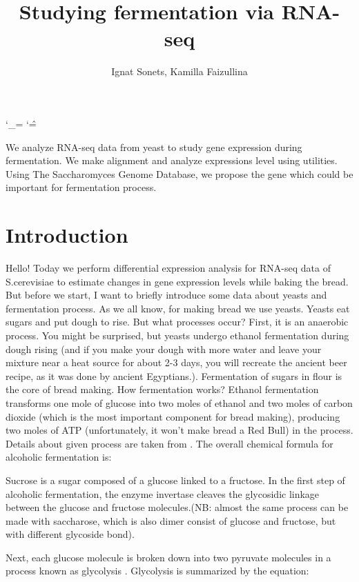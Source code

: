 \documentclass{article}
\title{Studying  fermentation via RNA-seq  }
\author{ Ignat Sonets, Kamilla Faizullina}
\date{\empty}
\begin{document}
	
		\catcode`\_=\active
	\catcode`\^=\active
	
\maketitle
 We analyze RNA-seq data from yeast  to study gene expression   during fermentation. We make alignment and analyze expressions level using utilities. Using The Saccharomyces Genome Database, we propose the gene which could be important for fermentation process. 
 
\section{Introduction}
 
 Hello! Today we perform differential expression analysis for RNA-seq data of S.cerevisiae to estimate changes in gene expression levels while baking the bread. But before we start, I want to briefly introduce some data about yeasts and fermentation process.
 As we all  know, for making bread we use yeasts. Yeasts eat sugars and put dough to rise. But what processes occur? First, it is an anaerobic process. You might be surprised, but yeasts undergo ethanol fermentation during dough rising (and if you make your dough with more water and leave your mixture near a heat source for about 2-3 days, you will recreate the ancient beer recipe, as it was done by ancient Egyptians.). Fermentation of sugars in flour is the core of bread making. How fermentation works? Ethanol fermentation transforms one mole of glucose into two moles of ethanol and two moles of carbon dioxide (which is the most important component for bread making), producing two moles of ATP (unfortunately, it won't make bread a Red Bull) in the process. 
 Details about given process are taken from \cite{1}.
 The overall chemical formula for alcoholic fermentation is:
 
 
 Sucrose is a sugar composed of a glucose linked to a fructose. In the first step of alcoholic fermentation, the enzyme invertase cleaves the glycosidic linkage between the glucose and fructose molecules.(NB: almost the same process can be made with saccharose, which is also dimer consist of glucose and fructose, but with different glycoside bond).
 
 
 Next, each glucose molecule is broken down into two pyruvate molecules in a process known as glycolysis \cite{2}. Glycolysis is summarized by the equation:
 
\end{document}
